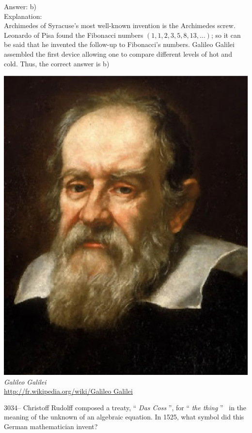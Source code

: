 \documentclass[letterpaper, 12pt]{article}
\begin{document}
Answer: b)\\

Explanation:\\
Archimedes of Syracuse's most well-known invention is the Archimedes screw. Leonardo of Pisa found the Fibonacci numbers $(1,1,2,3,5,8,13, \dots)$; so it can be said that he invented the follow-up to Fibonacci's numbers. Galileo Galilei assembled the first device allowing one to compare different levels of hot and cold. Thus, the correct answer is b)\\

\begin{center}
\includegraphics[scale=0.25]{Galilee.eps}\\
\emph{{\small Galileo Galilei}}\\
\href{http://fr.wikipedia.org/wiki/Galileo Galilei}{http://fr.wikipedia.org/wiki/Galileo Galilei}\\[5mm]
\end{center}



3034-- Christoff Rudolff composed a treaty, `` \emph{Das Coss} '', for `` \emph{the thing} '' \ in the meaning of the unknown of an algebraic equation. In 1525, what symbol did this German mathematician invent?\\
\end{document}
